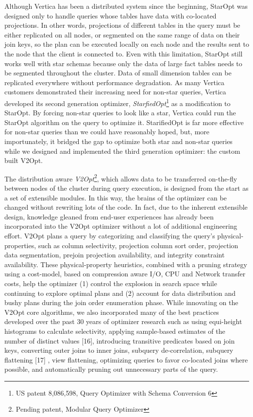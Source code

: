 \documentclass[a4paper,12pt,notitlepage,twoside,openright]{article}
\begin{document}
Although Vertica has been a distributed system since the beginning,
StarOpt was designed only to handle queries whose tables have data with
co-located projections. In other words, projections of different tables
in the query must be either replicated on all nodes, or segmented on the
same range of data on their join keys, so the plan can be executed
locally on each node and the results sent to the node that the client is
connected to. Even with this limitation, StarOpt still works well with
star schemas because only the data of large fact tables needs to be
segmented throughout the cluster. Data of small dimension tables can be
replicated everywhere without performance degradation. As many Vertica
customers demonstrated their increasing need for non-star queries,
Vertica developed its second generation optimizer,
\emph{StarfiedOpt}\footnote{US patent 8,086,598, Query Optimizer with
  Schema Conversion 6} as a modification to StarOpt. By forcing non-star
queries to look like a star, Vertica could run the StarOpt algorithm on
the query to optimize it. StarifiedOpt is far more effective for
non-star queries than we could have reasonably hoped, but, more
importunately, it bridged the gap to optimize both star and non-star
queries while we designed and implemented the third generation
optimizer: the custom built V2Opt.

The distribution aware \emph{V2Opt}\footnote{Pending patent, Modular
  Query Optimizer}, which allows data to be transferred on-the-fly
between nodes of the cluster during query execution, is designed from
the start as a set of extensible modules. In this way, the brains of the
optimizer can be changed without rewriting lots of the code. In fact,
due to the inherent extensible design, knowledge gleaned from end-user
experiences has already been incorporated into the V2Opt optimizer
without a lot of additional engineering effort. V2Opt plans a query by
categorizing and classifying the query's physical-properties, such as
column selectivity, projection column sort order, projection data
segmentation, prejoin projection availability, and integrity constraint
availability. These physical-property heuristics, combined with a
pruning strategy using a cost-model, based on compression aware I/O, CPU
and Network transfer costs, help the optimizer (1) control the explosion
in search space while continuing to explore optimal plans and (2)
account for data distribution and bushy plans during the join order
enumeration phase. While innovating on the V2Opt core algorithms, we
also incorporated many of the best practices developed over the past 30
years of optimizer research such as using equi-height histograms to
calculate selectivity, applying sample-based estimates of the number of
distinct values {[}16{]}, introducing transitive predicates based on
join keys, converting outer joins to inner joins, subquery
de-correlation, subquery flattening {[}17{]} , view flattening,
optimizing queries to favor co-located joins where possible, and
automatically pruning out unnecessary parts of the query.
\end{document}

